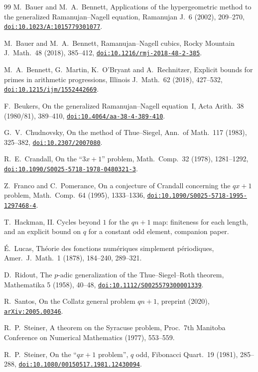 \documentclass[11pt]{article}
\newcommand{\doilink}[1]{\href{https://doi.org/#1}{\nolinkurl{doi:#1}}}
\begin{document}
\begin{thebibliography}{99}
M.~Bauer and M.~A.~Bennett, Applications of the hypergeometric method to the generalized Ramanujan--Nagell equation, Ramanujan J.\ 6 (2002), 209--270, \doilink{10.1023/A:1015779301077}.

M.~Bauer and M.~A.~Bennett, Ramanujan--Nagell cubics, Rocky Mountain J.\ Math.\ 48 (2018), 385--412, \doilink{10.1216/rmj-2018-48-2-385}.

M.~A.~Bennett, G.~Martin, K.~O'Bryant and A.~Rechnitzer, Explicit bounds for primes in arithmetic progressions, Illinois J.\ Math.\ 62 (2018), 427--532, \doilink{10.1215/ijm/1552442669}.

F.~Beukers, On the generalized Ramanujan--Nagell equation~I, Acta Arith.\ 38 (1980/81), 389--410, \doilink{10.4064/aa-38-4-389-410}.

G.~V.~Chudnovsky, On the method of Thue--Siegel, Ann.\ of Math.\ 117 (1983), 325--382, \doilink{10.2307/2007080}.

R.~E.~Crandall, On the ``$3x+1$'' problem, Math.\ Comp.\ 32 (1978), 1281--1292, \doilink{10.1090/S0025-5718-1978-0480321-3}.

Z.~Franco and C.~Pomerance, On a conjecture of Crandall concerning the $qx+1$ problem, Math.\ Comp.\ 64 (1995), 1333--1336, \doilink{10.1090/S0025-5718-1995-1297468-4}.

T.~Hackman, II. Cycles beyond $1$ for the $qn+1$ map: finiteness for each length, and an explicit bound on $q$ for a constant odd element, companion paper.

\'E.~Lucas, Th\'eorie des fonctions num\'eriques simplement p\'eriodiques, Amer.\ J.\ Math.\ 1 (1878), 184--240, 289--321.

D.~Ridout, The $p$-adic generalization of the Thue--Siegel--Roth theorem, Mathematika 5 (1958), 40--48, \doilink{10.1112/S0025579300001339}.

R.~Santos, On the Collatz general problem $qn+1$, preprint (2020), \href{https://arxiv.org/abs/2005.00346}{\nolinkurl{arXiv:2005.00346}}.

R.~P.~Steiner, A theorem on the Syracuse problem, Proc.\ 7th Manitoba Conference on Numerical Mathematics (1977), 553--559.

R.~P.~Steiner, On the ``$qx + 1$ problem'', $q$ odd, Fibonacci Quart.\ 19 (1981), 285--288, \doilink{10.1080/00150517.1981.12430094}.
\end{thebibliography}
\end{document}
